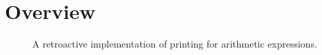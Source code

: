 \section{Overview}\label{subsec:backgound}



\begin{figure}[tb]
\vspace{-.1in}
\caption{A retroactive implementation of printing for arithmetic expressions.\label{subsec:backgound}}
\end{figure}
